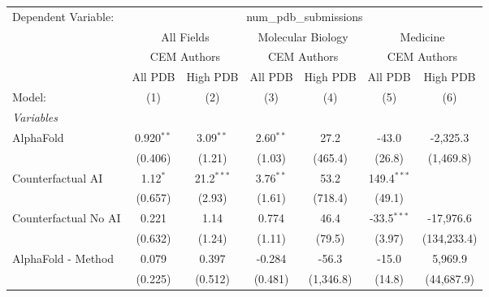 \begingroup
\centering
\begin{tabular}{lcccccc}
   \tabularnewline \midrule \midrule
   Dependent Variable: & \multicolumn{6}{c}{num\_pdb\_submissions}\\
 & \multicolumn{2}{c}{All Fields} & \multicolumn{2}{c}{Molecular Biology} & \multicolumn{2}{c}{Medicine} \\
\cmidrule(lr){2-3} \cmidrule(lr){4-5} \cmidrule(lr){6-7}
 & \multicolumn{2}{c}{CEM Authors} & \multicolumn{2}{c}{CEM Authors} & \multicolumn{2}{c}{CEM Authors} \\
\cmidrule(lr){2-3} \cmidrule(lr){4-5} \cmidrule(lr){6-7}
 & \multicolumn{1}{c}{All PDB} & \multicolumn{1}{c}{High PDB} & \multicolumn{1}{c}{All PDB} & \multicolumn{1}{c}{High PDB} & \multicolumn{1}{c}{All PDB} & \multicolumn{1}{c}{High PDB} \\
\cmidrule(lr){2-2} \cmidrule(lr){3-3} \cmidrule(lr){4-4} \cmidrule(lr){5-5} \cmidrule(lr){6-6} \cmidrule(lr){7-7}
   Model:                                                     & (1)          & (2)           & (3)          & (4)       & (5)           & (6)\\  
   \midrule
   \emph{Variables}\\
   AlphaFold                                                  & 0.920$^{**}$ & 3.09$^{**}$   & 2.60$^{**}$  & 27.2      & -43.0         & -2,325.3\\   
                                                              & (0.406)      & (1.21)        & (1.03)       & (465.4)   & (26.8)        & (1,469.8)\\   
   Counterfactual AI                                          & 1.12$^{*}$   & 21.2$^{***}$  & 3.76$^{**}$  & 53.2      & 149.4$^{***}$ &   \\   
                                                              & (0.657)      & (2.93)        & (1.61)       & (718.4)   & (49.1)        &   \\   
   Counterfactual No AI                                       & 0.221        & 1.14          & 0.774        & 46.4      & -33.5$^{***}$ & -17,976.6\\   
                                                              & (0.632)      & (1.24)        & (1.11)       & (79.5)    & (3.97)        & (134,233.4)\\   
   AlphaFold - Method                                         & 0.079        & 0.397         & -0.284       & -56.3     & -15.0         & 5,969.9\\   
                                                              & (0.225)      & (0.512)       & (0.481)      & (1,346.8) & (14.8)        & (44,687.9)\\   

\end{tabular}
